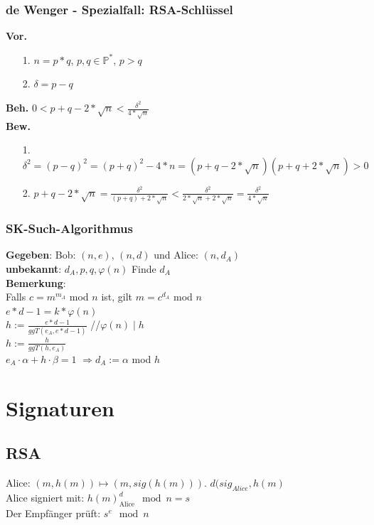 \documentclass[10pt]{article}
\newcommand{\PN}{\mathbb{P}} %
\newcommand{\Bold}[1]{\textbf{#1}} %
\newcommand{\Ra}{\Rightarrow}
\begin{document}
\subsubsection{de Wenger - Spezialfall: RSA-Schlüssel}
\Bold{Vor.}
\begin{itemize}
	\item[1.] $n=p*q$, $p,q \in \PN^*$, $p>q$ 
	\item[2.] $\delta=p-q$
\end{itemize}
\Bold{Beh.} $0 < p+q - 2 * \sqrt{n} < \frac{\delta^2}{4 * \sqrt{n}}$ \\
\Bold{Bew.}
\begin{itemize}
	\item[1.] $\delta^2= (p-q)^2=(p+q)^2-4*n=(p+q-2*\sqrt{n})(p+q+2*\sqrt{n})>0$ 
	\item[2.] $p+q-2*\sqrt{n} = \frac{\delta^2}{(p+q)+2*\sqrt{n}} < \frac{\delta^2}{2*\sqrt{n}+2*\sqrt{n}}= \frac{\delta^2}{4 * \sqrt{n}}$
\end{itemize}
\subsubsection{SK-Such-Algorithmus}
{
\textbf{Gegeben}: Bob: $(n,e)$, $(n,d)$ und Alice: $(n,d_A)$ \\
\textbf{unbekannt}: $d_A,p,q,\varphi(n)$ Finde $d_A$ \\
\textbf{Bemerkung}: \\
    Falls $c=m^{m_A}$ mod $n$ ist, gilt $m=c^{d_A}$ mod $n$ \\
    $e*d-1=k*\varphi(n)$ \\
    $h:=\frac{e*d-1}{ggT(e_A,e*d-1)}$ \hspace*{2cm}//$\varphi(n)\mid h$\\
    $h:=\frac{h}{ggT(h,e_A)}$ \\
    $e_A\cdot\alpha+h\cdot\beta=1 $ {\color{red}$\Ra d_A:=\alpha$ mod $h$}
}

\section{Signaturen}
\subsection{RSA}
Alice: $(m, h(m)) \mapsto (m, sig(h(m)))$. $d(sig_{Alice}, h(m)$ \\ Alice signiert mit: $h(m)^d_{\text{Alice}} \mod n = s$ \\
Der Empfänger prüft: $s^e \mod n$
\end{document}
